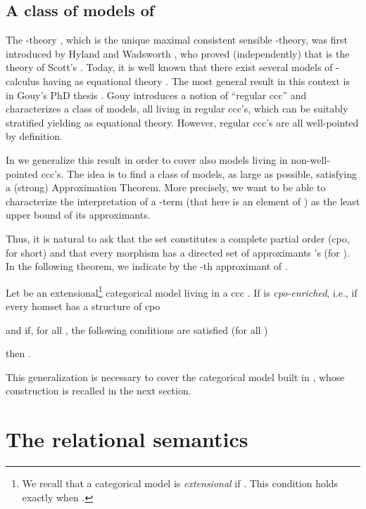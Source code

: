 \documentclass[english]{llncs}
\begin{document}
\subsection{A class of models of }

The -theory , which is the unique maximal consistent sensible -theory, was first introduced by 
Hyland \cite{Hyland75} and Wadsworth \cite{Wadsworth76}, who proved (independently) that  is the theory of 
Scott's  \cite[Thm.~19.2.9]{Bare}.
Today, it is well known that there exist several models of -calculus having as equational theory 
\cite{Bare,GouyTh,DiGianantonioFH91}.
The most general result in this context is in Gouy's PhD thesis \cite{GouyTh}. 
Gouy introduces a notion of ``regular ccc'' and characterizes a class of models, all living in regular ccc's, 
which can be suitably stratified yielding  as equational theory. 
However, regular ccc's are all well-pointed by definition.

In \cite[Chapter~2]{ManzonettoTh} we generalize this result in order to cover also models living in non-well-pointed ccc's. 
The idea is to find a class of models, as large as possible, satisfying a (strong) Approximation Theorem.
More precisely, we want to be able to characterize the interpretation of a -term  (that here is an element of ) 
as the least upper bound of its approximants.

Thus, it is natural to ask that the set  constitutes a complete partial order (cpo, for short) 
and that every morphism  has a directed set of approximants 's (for ).
In the following theorem, we indicate by  the -th approximant of .




\begin{theorem}\label{thm: a model of H*}\cite[Thm.~2.3.35]{ManzonettoTh}
Let  be an extensional\footnote{
We recall that a categorical model  is {\em extensional} if .
This condition holds exactly when .} categorical model living in a ccc .
If  is {\em cpo-enriched}, i.e., if every homset has a structure of cpo

and if, for all , the following conditions are satisfied (for all )

then .
\end{theorem}

This generalization is necessary to cover the categorical model  built in \cite[Chapter~2]{ManzonettoTh},
whose construction is recalled in the next section.




\section{The relational semantics}\label{sec:The relational semantics}
\end{document}
